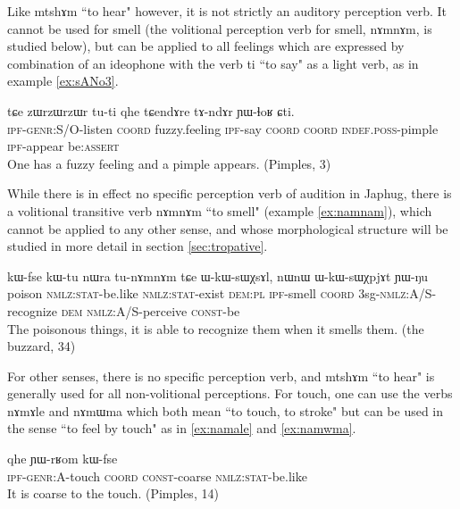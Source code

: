\documentclass[oldfontcommands,oneside,a4paper,11pt]{article}
\newcommand{\ipa}[1]{{\phon #1}} %
\begin{document}
Like \ipa{mtshɤm} ``to hear" however, it is not strictly an auditory perception verb. It cannot be used for smell (the volitional perception verb for smell, \ipa{nɤmnɤm}, is studied below), but can be applied to all feelings which are expressed by combination of an ideophone with the verb \ipa{ti} ``to say" as a light verb, as in example \ref{ex:sANo3}.

		 \begin{exe}
\ex \label{ex:sANo3}
\gll \ipa{ɲɯ-kɯ-sɤŋo}   	\ipa{tɕe}   	\ipa{zɯrzɯrzɯr}   	\ipa{tu-ti}   	\ipa{qhe}   	\ipa{tɕendɤre}   	\ipa{tɤ-ndɤr}   	\ipa{ɲɯ-ɬoʁ}   	\ipa{ɕti.}\\
\textsc{ipf-genr:S/O}-listen \textsc{coord}  fuzzy.feeling \textsc{ipf}-say \textsc{coord} \textsc{coord} \textsc{indef.poss}-pimple \textsc{ipf}-appear be:\textsc{assert} \\
 \glt  One has a fuzzy feeling and a pimple  appears. (Pimples, 3)
\end{exe} 
  	
While there is in effect no specific perception verb of audition in Japhug, there is a volitional transitive verb  	\ipa{nɤmnɤm} ``to smell" (example \ref{ex:namnam}), which cannot be applied to any other sense, and whose morphological structure will be studied in more detail in section \ref{sec:tropative}.
 
 \begin{exe}
\ex \label{ex:namnam}
\gll \ipa{tɯɣ}  	\ipa{kɯ-fse}  	\ipa{kɯ-tu}  	\ipa{nɯra}  	\ipa{tu-nɤmnɤm}  	\ipa{tɕe}  	\ipa{ɯ-kɯ-sɯχsɤl,}  	\ipa{nɯnɯ}  	\ipa{ɯ-kɯ-sɯχpjɤt}  	\ipa{ɲɯ-ŋu}   \\
poison  \textsc{nmlz:stat}-be.like  \textsc{nmlz:stat}-exist \textsc{dem:pl} \textsc{ipf}-smell \textsc{coord} 3sg-\textsc{nmlz:A/S}-recognize \textsc{dem} \textsc{nmlz:A/S}-perceive \textsc{const}-be \\
\glt The poisonous things, it is able to recognize them when it smells them. (the buzzard, 34)
\end{exe}



For other senses, there is no specific perception verb, and \ipa{mtshɤm} ``to hear" is generally used for all non-volitional perceptions. For touch, one can use the verbs \ipa{nɤmɤle}	and \ipa{nɤmɯma} which both mean ``to touch, to stroke" but can be used in the sense ``to feel by touch" as in \ref{ex:namale} and \ref{ex:namwma}.

 \begin{exe}
\ex \label{ex:namale}
\gll \ipa{ɲɯ́-wɣ-nɤmɤle}   	\ipa{qhe}   	\ipa{ɲɯ-rʁom}   	\ipa{kɯ-fse}   	\\
\textsc{ipf-genr:A}-touch \textsc{coord}  \textsc{const}-coarse  \textsc{nmlz:stat}-be.like\\
 \glt  It is coarse to the touch. (Pimples, 14)
\end{exe} 
 
\end{document}
